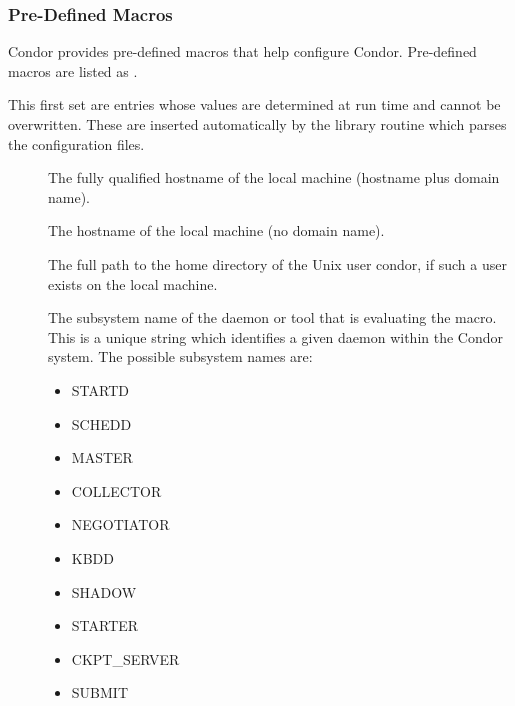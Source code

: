 \subsubsection{\label{sec:Pre-Defined-Macros}
Pre-Defined Macros}

Condor provides pre-defined macros that help configure Condor.
Pre-defined macros are listed as .

This first set are entries whose values are determined at
run time and cannot be overwritten.  These are inserted automatically by
the library routine which parses the configuration files.
\begin{description}
  
\item[] \label{param:FullHostname}
  The
  fully qualified hostname of the local machine (hostname plus domain
  name).
  
\item[] \label{param:Hostname}
  The hostname of the local machine (no domain name).
  
\item[] \label{param:Tilde}
  The full path to the
  home directory of the Unix user condor, if such a user exists on the
  local machine.

\label{sec:Condor-Subsystem-Names}
\item[] \label{param:Subsystem}
  The subsystem
  name of the daemon or tool that is evaluating the macro.
  This is a unique string which identifies a given daemon within the
  Condor system.  The possible subsystem names are:

  \begin{itemize}
  \item STARTD
  \item SCHEDD
  \item MASTER
  \item COLLECTOR
  \item NEGOTIATOR
  \item KBDD 
  \item SHADOW
  \item STARTER
  \item CKPT\_SERVER
  \item SUBMIT
  \label{list:subsystem names}
  \end{itemize}

\end{description}


